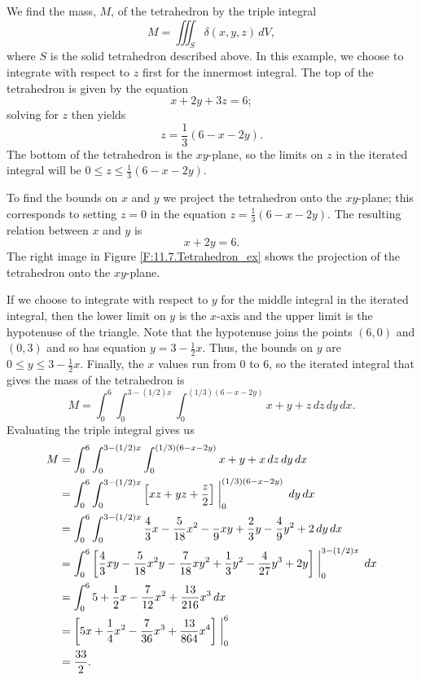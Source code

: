 \begin{example}
We find the mass, $M$, of the tetrahedron by the triple integral
\[ M = \iiint_S \delta(x,y,z) \, dV,\]
where $S$ is the solid tetrahedron described above. In this example, we choose to integrate with respect to $z$ first for the innermost integral. The top of the tetrahedron is given by the equation
\[x + 2 y + 3 z = 6;\]
 solving for $z$ then yields
\[z = \frac{1}{3}(6 - x - 2y).\]
The bottom of the tetrahedron is the $xy$-plane, so the limits on $z$ in the iterated integral will be $0 \leq z \leq \frac{1}{3}(6-x-2y)$.

To find the bounds on $x$ and $y$ we project the tetrahedron onto the $xy$-plane; this corresponds to setting $z = 0$ in the equation $z = \frac{1}{3}(6 - x - 2y)$. The resulting relation between $x$ and $y$ is
\[x + 2 y = 6.\]
The right image in Figure \ref{F:11.7.Tetrahedron_ex} shows the projection of the tetrahedron onto the $xy$-plane.

If we choose to integrate with respect to $y$ for the middle integral in the iterated integral, then the lower limit on $y$ is the $x$-axis and the upper limit is the hypotenuse of the triangle. Note that the hypotenuse joins the points $(6,0)$ and $(0,3)$ and so has equation $y = 3 - \frac{1}{2}x$. Thus, the bounds on $y$ are $0 \leq y \leq 3 - \frac{1}{2}x$. Finally, the $x$ values run from 0 to 6, so the iterated integral that gives the mass of the tetrahedron is
\begin{equation}
M = \int_{0}^{6} \int_{0}^{3-(1/2)x} \int_{0}^{(1/3)(6-x-2y)} x+y+z \, dz \, dy \, dx. \label{eq:11.7.Tetrahedron_mass}
\end{equation}
Evaluating the triple integral gives us
\begin{align*}
M & = \int_{0}^{6} \int_{0}^{3-(1/2)x} \int_{0}^{(1/3)(6-x-2y)} x+y+x \, dz \, dy \, dx  \\
    &= \int_{0}^{6} \int_{0}^{3-(1/2)x} \left[xz+yz+\frac{z}{2}\right]\biggm|_{0}^{(1/3)(6-x-2y)} \, dy \, dx \\
	&= \int_{0}^{6} \int_{0}^{3-(1/2)x} \frac{4}{3}x - \frac{5}{18}x^2 - \frac{}{9}xy + \frac{2}{3}y - \frac{4}{9}y^2 + 2 \, dy \, dx \\
	&= \int_{0}^{6} \left[\frac{4}{3}xy - \frac{5}{18}x^2y - \frac{7}{18}xy^2 + \frac{1}{3}y^2 - \frac{4}{27}y^3 + 2y \right]\biggm|_{0}^{3-(1/2)x}  \, dx \\
	&= \int_{0}^{6} 5 + \frac{1}{2}x - \frac{7}{12}x^2 + \frac{13}{216}x^3 \, dx \\
	&=  \left[5x + \frac{1}{4}x^2 - \frac{7}{36}x^3 + \frac{13}{864}x^4 \right] \biggm|_{0}^{6} \\
	&= \frac{33}{2}.
\end{align*}
\end{example}

